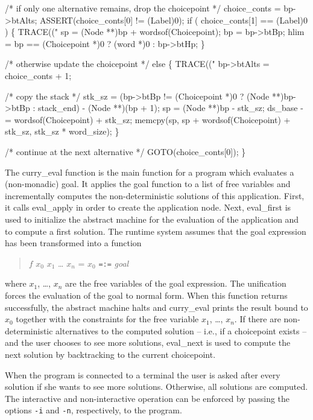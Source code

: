     /* if only one alternative remains, drop the choicepoint */
    choice_conts = bp->btAlts;
    ASSERT(choice_conts[0] != (Label)0);
    if ( choice_conts[1] == (Label)0 )
    \{
        TRACE(("%
        sp   = (Node **)bp + wordsof(Choicepoint);
        bp   = bp->btBp;
        hlim = bp == (Choicepoint *)0 ? (word *)0 : bp->btHp;
    \}

    /* otherwise update the choicepoint */
    else
    \{
        TRACE(("%
        bp->btAlts = choice_conts + 1;

        /* copy the stack */
        stk_sz =
            (bp->btBp != (Choicepoint *)0 ? (Node **)bp->btBp : stack_end)
                - (Node **)(bp + 1);
        sp       = (Node **)bp - stk_sz;
        ds_base -= wordsof(Choicepoint) + stk_sz;
        memcpy(sp, sp + wordsof(Choicepoint) + stk_sz, stk_sz * word_size);
    \}

    /* continue at the next alternative */
    GOTO(choice_conts[0]);
\}

\nwendcode{}\nwdocspar
The {\Tt{}curry{\_}eval\nwendquote} function is the main function for a program which
evaluates a (non-monadic) goal. It applies the goal function to a list
of free variables and incrementally computes the non-deterministic
solutions of this application. First, it calls {\Tt{}eval{\_}apply\nwendquote} in order
to create the application node. Next, {\Tt{}eval{\_}first\nwendquote} is used to
initialize the abstract machine for the evaluation of the application
and to compute a first solution. The runtime system assumes that the
goal expression has been transformed into a function
\begin{quote}
  $f$ $x_0$ $x_1$ \dots{} $x_n$ = $x_0$ \texttt{=:=} \emph{goal}
\end{quote}
where $x_1$, \dots, $x_n$ are the free variables of the goal
expression. The unification forces the evaluation of the goal to
normal form. When this function returns successfully, the abstract
machine halts and {\Tt{}curry{\_}eval\nwendquote} prints the result bound to $x_0$
together with the constraints for the free variable $x_1$, \dots,
$x_n$. If there are non-deterministic alternatives to the computed
solution -- i.e., if a choicepoint exists -- and the user chooses to
see more solutions, {\Tt{}eval{\_}next\nwendquote} is used to compute the next solution
by backtracking to the current choicepoint.

When the program is connected to a terminal the user is asked after
every solution if she wants to see more solutions. Otherwise, all
solutions are computed. The interactive and non-interactive operation
can be enforced by passing the options \texttt{-i} and \texttt{-n},
respectively, to the program.

